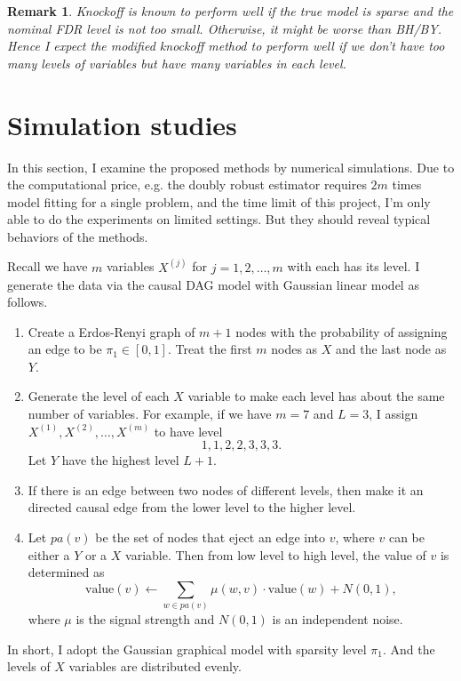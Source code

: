 \documentclass[11pt]{article}
\newtheorem{remark}{Remark}[section]
\begin{document}
\begin{remark}
    Knockoff is known to perform well if the true model is sparse and the nominal FDR level is not too small. Otherwise, it might be worse than BH/BY. Hence I expect the modified knockoff method to perform well if we don't have too many levels of variables but have many variables in each level.
\end{remark}

\section{Simulation studies}%
\label{sec:simulation_studies}

In this section, I examine the proposed methods by numerical simulations. Due to the computational price, e.g. the doubly robust estimator requires $2m$ times model fitting for a single problem, and the time limit of this project, I'm only able to do the experiments on limited settings. But they should reveal typical behaviors of the methods.

Recall we have $m$ variables $X^{(j)}$ for $j = 1, 2, \ldots, m$ with each has its level. I generate the data via the causal DAG model with Gaussian linear model as follows.
\begin{enumerate}
    \item Create a Erdos-Renyi graph of $m+1$ nodes with the probability of assigning an edge to be $\pi_1 \in [0, 1]$. Treat the first $m$ nodes as $X$ and the last node as $Y$.
    \item Generate the level of each $X$ variable to make each level has about the same number of variables. For example, if we have $m=7$ and $L=3$, I assign $X^{(1)}, X^{(2)}, \ldots, X^{(m)}$ to have level
        \[1, 1, 2, 2, 3, 3, 3.\]
        Let $Y$ have the highest level $L+1$.
    \item If there is an edge between two nodes of different levels, then make it an directed causal edge from the lower level to the higher level.
    \item Let $pa(v)$ be the set of nodes that eject an edge into $v$, where $v$ can be either a $Y$ or a $X$ variable. Then from low level to high level, the value of $v$ is determined as
        \[ \text{value}(v) \leftarrow \sum_{w \in pa(v)} \mu(w,v) \cdot \text{value}(w) + N(0,1), \]
        where $\mu$ is the signal strength and $N(0,1)$ is an independent noise.
\end{enumerate}
In short, I adopt the Gaussian graphical model with sparsity level $\pi_1$. And the levels of $X$ variables are distributed evenly.
\end{document}
